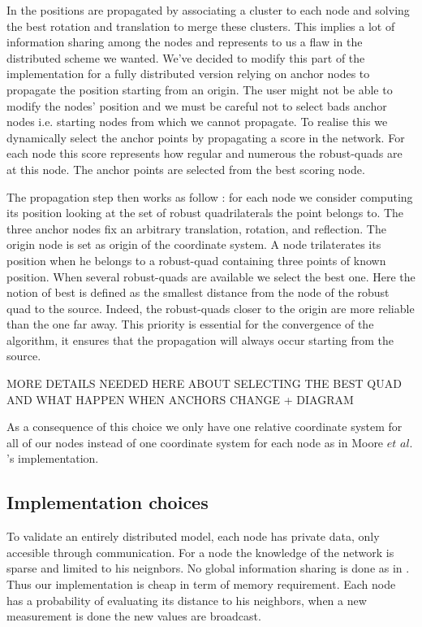 \documentclass[letterpaper, 10 pt, conference]{ieeeconf}  %
\begin{document}
In \cite{} the positions are propagated by associating a cluster to each node and solving the best rotation and translation to merge these clusters. This implies a lot of information sharing among the nodes and represents to us a flaw in the distributed scheme we wanted. We've decided to modify this part of the implementation for a fully distributed version relying on anchor nodes to propagate the position starting from an origin. The user might not be able to modify the nodes' position and we must be careful not to select bads anchor nodes i.e. starting nodes from which we cannot propagate. To realise this we dynamically select the anchor points by propagating a score in the network. For each node this score represents how regular and numerous the robust-quads are at this node. The anchor points are selected from the best scoring node. 

The propagation step then works as follow : for each node we consider computing its position looking at the set of robust quadrilaterals the point belongs to. The three anchor nodes fix an arbitrary translation, rotation, and reflection. The origin node is set as origin of the coordinate system. A node trilaterates its position when he belongs to a robust-quad containing three points of known position. When several robust-quads are available we select the best one. Here the notion of best is defined as the smallest distance from the node of the robust quad to the source. Indeed, the robust-quads closer to the origin are more reliable than the one far away. This priority is essential for the convergence of the algorithm, it ensures that the propagation will always occur starting from the source.

MORE DETAILS NEEDED HERE ABOUT SELECTING THE BEST QUAD AND WHAT HAPPEN WHEN ANCHORS CHANGE + DIAGRAM

As a consequence of this choice we only have one relative coordinate system for all of our nodes instead of one coordinate system for each node as in Moore $et$ $al.$'s implementation. 

\subsection{Implementation choices}

To validate an entirely distributed model, each node has private data, only accesible through communication. For a node the knowledge of the network is sparse and limited to his neignbors. No global information sharing is done as in \cite{}. Thus our implementation is cheap in term of memory requirement. Each node has a probability of evaluating its distance to his neighbors, when a new measurement is done the new values are broadcast.\newline
\end{document}
